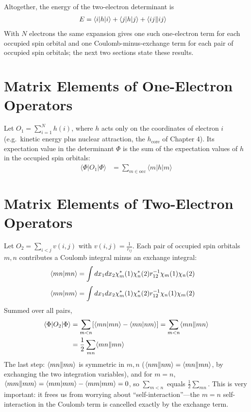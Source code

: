 Altogether, the energy of the two-electron determinant is
\begin{align*}
E &= \langle i|h|i\rangle + \langle j|h|j\rangle + \langle ij\Vert ij\rangle
\end{align*}
With $N$ electrons the same expansion gives one such one-electron term for each occupied spin orbital and one Coulomb-minus-exchange term for each pair of occupied spin orbitals; the next two sections state these results.


\section{Matrix Elements of One-Electron Operators}

Let $O_1 = \sum_{i=1}^N h(i)$, where $h$ acts only on the coordinates of electron $i$ (e.g.\ kinetic energy plus nuclear attraction, the $h_{\text{core}}$ of Chapter 4). Its expectation value in the determinant $\Phi$ is the sum of the expectation values of $h$ in the occupied spin orbitals:
\begin{align}\label{eq:sc-1e-diag}
\langle \Phi|O_1|\Phi\rangle &= \sum_{m \in \text{occ}} \langle m|h|m\rangle
\end{align}

\section{Matrix Elements of Two-Electron Operators}

Let $O_2 = \sum_{i<j} v(i, j)$ with $v(i, j) = \frac{1}{r_{ij}}$. Each pair of occupied spin orbitals $m, n$ contributes a Coulomb integral minus an exchange integral:
\begin{align*}
\langle mn\vert mn\rangle &= \int dx_1 dx_2 \chi_m^*(1) \chi_n^*(2) r_{12}^{-1} \chi_m(1) \chi_n(2)
\end{align*}
\begin{align*}
\langle mn\vert nm\rangle &= \int dx_1 dx_2 \chi_m^*(1) \chi_n^*(2) r_{12}^{-1} \chi_n(1) \chi_m(2)
\end{align*}
Summed over all pairs,
\begin{align}\label{eq:sc-2e-diag}
\langle \Phi|O_2|\Phi\rangle &= \sum_{m<n} [\langle mn\vert mn\rangle - \langle mn\vert nm\rangle] = \sum_{m<n} \langle mn\Vert mn\rangle \\
&= \frac{1}{2} \sum_{mn} \langle mn\Vert mn\rangle \notag
\end{align}
The last step: $\langle mn\Vert mn\rangle$ is symmetric in $m, n$ ($\langle nm\Vert nm\rangle = \langle mn\Vert mn\rangle$, by exchanging the two integration variables), and for $m = n$, $\langle mm\Vert mm\rangle = \langle mm\vert mm\rangle - \langle mm\vert mm\rangle = 0$, so $\sum_{m<n}$ equals $\frac{1}{2} \sum_{mn}$. This is very important: it frees us from worrying about ``self-interaction''---the $m = n$ self-interaction in the Coulomb term is cancelled exactly by the exchange term.


